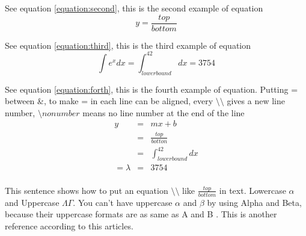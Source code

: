 \documentclass[12pt,letterpaper,onecolumn]{report}
\begin{document}
See equation \ref{equation:second}, this is the second example of equation
\begin{equation}
y=\frac{top}{bottom}
\label{equation:second}
\end{equation}

See equation \ref{equation:third}, this is the third example of equation
\begin{equation}
\int e^x dx
=\int_{lowerbound}^{42} dx = 3754
\label{equation:third}
\end{equation}


See equation \ref{equation:forth}, this is the fourth example of equation. Putting = between \&, to make = in each line can be aligned, every $\setminus\setminus$ gives a new line number, $\setminus nonumber$ means no line number at the end of the line
\begin{eqnarray} %
y&=&mx+b\nonumber \\
&=&\frac{top}{botton}\nonumber	\\
\label{equation:forth}
&=&\int_{lowerbound}^{42} dx \\
=\lambda&=& 3754\\
\label{equation:five}
\end{eqnarray}


This sentence shows how to put an equation $\setminus\setminus$ like $\frac{top}{bottom} $ in text. 
Lowercase $\alpha$ and Uppercase $\Lambda \Gamma$. You can't have uppercase $\alpha$ and $\beta$ by using Alpha and Beta, because their uppercase formats are as same as A and B \cite{Terry2013}. %
This is another reference according to this articles\cite{Lamport2001}.



\medskip


\end{document}
